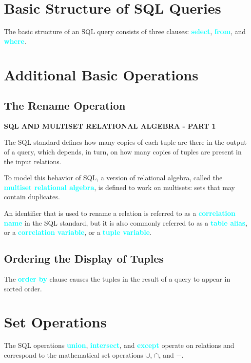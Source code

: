 \documentclass[a4paper,12pt,twoside,openany]{book}
\newcommand{\textcy}[1]{\textbf{\textcolor{cyan}{#1}}}
\begin{document}
\section{Basic Structure of SQL Queries}

The basic structure of an SQL query consists of three clauses: \textcy{select}, \textcy{from}, and \textcy{where}.

\section{Additional Basic Operations}
\subsection{The Rename Operation}

\begin{framed}
    \begin{center}
        {\textbf{SQL AND MULTISET RELATIONAL ALGEBRA - PART 1}}
    \end{center}

    The SQL standard defines how many copies of each tuple are there in the output of a query, which depends, in turn, on how many copies of tuples are present in the input relations.

    To model this behavior of SQL, a version of relational algebra, called the \textcy{multiset relational algebra}, is defined to work on multisets: sets that may contain duplicates.
\end{framed}

An identifier that is used to rename a relation is referred to as a \textcy{correlation name} in the SQL standard, but it is also commonly referred to as a \textcy{table alias}, or a \textcy{correlation variable}, or a \textcy{tuple variable}.

\subsection{Ordering the Display of Tuples}

The \textcy{order by} clause causes the tuples in the result of a query to appear in sorted order.

\section{Set Operations}

The SQL operations \textcy{union}, \textcy{intersect}, and \textcy{except} operate on relations and correspond to the mathematical set operations $\cup$, $\cap$, and $-$.
\end{document}
